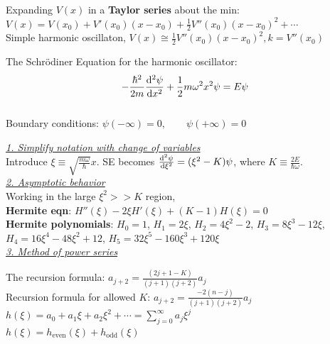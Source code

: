 Expanding $V(x)$ in a \textbf{Taylor series} about the min: $V(x) = V(x_0) + V'(x_0) (x - x_0) + \frac{1}{2} V''(x_0)(x- x_0)^2 + \cdots$ \\
Simple harmonic oscillaton, $V(x) \cong \frac{1}{2} V''(x_0) (x - x_0)^2, k = V''(x_0)$

The Schr\"{o}diner Equation for the harmonic oscillator: $$-\frac{\hbar^2}{2m} \dv[2]{\psi}{x} + \frac{1}{2} m \omega^2 x^2 \psi = E \psi$$ \\

Boundary conditions: $\psi(-\infty) = 0, \qquad \psi(+\infty) = 0$

\medskip

\textit{\underline{1. Simplify notation with change of variables}} \\
Introduce $\xi \equiv \sqrt{\frac{m \omega}{\hbar}} x$.
SE becomes $\dv[2]{\psi}{\xi} = (\xi^2 - K) \psi$, where $K \equiv \frac{2E}{\hbar \omega}$. \\

\textit{\underline{2. Asymptotic behavior}} \\

Working in the large $\xi^2 >> K$ region, \\
\textbf{Hermite eqn}: $H''(\xi) - 2 \xi H'(\xi) + (K - 1) H(\xi) = 0$ \\

\textbf{Hermite polynomials}: $H_0 = 1$, $H_1 = 2 \xi$, $H_2 = 4 \xi^2 - 2$, $H_3 = 8 \xi^3 - 12 \xi$, $H_4 = 16 \xi^4 - 48 \xi^2 + 12$, $H_5 = 32 \xi^5 - 160 \xi^3 + 120 \xi$ \\

\textit{\underline{3. Method of power series}}


The recursion formula: $a_{j+2} = \frac{(2j + 1 - K)}{(j + 1)(j + 2)} a_j$ \\
Recursion formula for allowed $K$: $a_{j+2} = \frac{-2(n - j)}{(j+1)(j+2)} a_j$ \\

$h(\xi) = a_0 + a_1 \xi + a_2 \xi^2 + \cdots = \sum_{j=0}^{\infty} a_j \xi^j$ \\
$h(\xi) = h_{\text{even}}(\xi) + h_{\text{odd}}(\xi)$ \\



